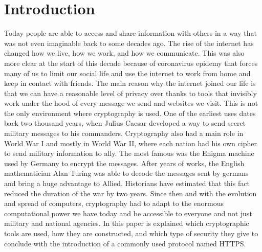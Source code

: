 \chapter{Introduction}
\par
Today people are able to access and share information with others in a way that was not even imaginable back to some decades ago. The rise of the internet has changed how we live, how we work, and how we communicate. This was also more clear at the start of this decade because of coronavirus epidemy that forces many of us to limit our social life and use the internet to work from home and keep in contact with friends. The main reason why the internet joined our life is that we can have a reasonable level of privacy over thanks to tools that invisibly work under the hood of every message we send and websites we visit. This is not the only environment where cryptography is used. One of the earliest uses dates back two thousand years, when Julius Caesar developed a way to send secret military messages to his commanders. Cryptography also had a main role in World War I and mostly in World War II, where each nation had his own cipher to send military information to ally. The most famous was the Enigma machine used by Germany to encrypt the messages. After years of works, the English mathematician Alan Turing was able to decode the messages sent by germans and bring a huge advantage to Allied. Historians have estimated that this fact reduced the duration of the war by two years. Since then and with the evolution and spread of computers, cryptography had to adapt to the enormous computational power we have today and be accessible to everyone and not just military and national agencies. In this paper is explained which cryptographic tools are used, how they are constructed, and which type of security they give to conclude with the introduction of a commonly used protocol named HTTPS.

